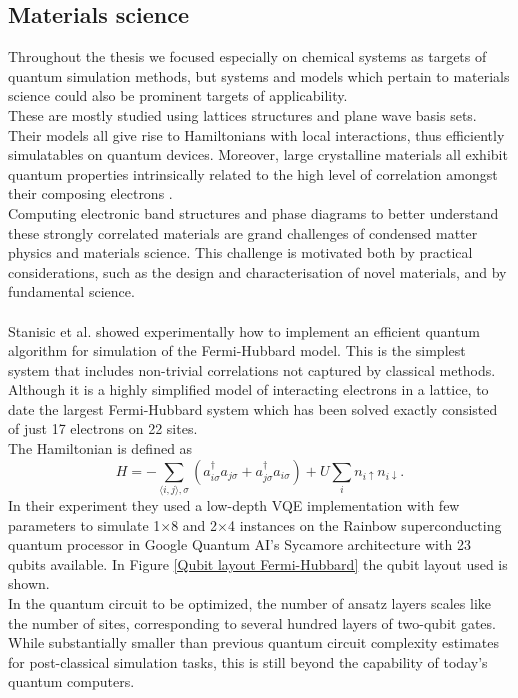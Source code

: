 \subsection{Materials science}
Throughout the thesis we focused especially on chemical systems as targets of quantum simulation methods, but systems and models which pertain to materials science could also be prominent targets of applicability. \\
These are mostly studied using lattices structures and plane wave basis sets. Their models all give rise to Hamiltonians with local interactions, thus efficiently simulatables on quantum devices. Moreover, large crystalline materials all exhibit quantum properties intrinsically related to the high level of correlation amongst their composing electrons \cite{Bassman2021Sep}. \\
Computing electronic band structures and phase diagrams to better understand these strongly correlated materials are grand challenges of condensed matter physics and materials science. This challenge is motivated both by practical considerations, such as the design and characterisation of novel materials, and by fundamental science. \\
\\
Stanisic et al. \cite{Stanisic2021Dec} showed experimentally how to implement an efficient quantum algorithm for simulation of the Fermi-Hubbard model. This is the simplest system that includes non-trivial correlations not captured by classical methods. Although it is a highly simplified model of interacting electrons in a lattice, to date the largest Fermi-Hubbard system which has been solved exactly consisted of just 17 electrons on 22 sites. \\
The Hamiltonian is defined as
\begin{equation}
    H = -\sum_{\langle i,j \rangle, \sigma} (a^{\dagger}_{i\sigma} a_{j\sigma} + a^{\dagger}_{j\sigma} a_{i\sigma}) + U\sum_i n_{i\uparrow} n_{i\downarrow}.
\end{equation}
In their experiment they used a low-depth VQE implementation with few parameters to simulate 1$\times$8 and 2$\times$4 instances on the Rainbow superconducting quantum processor in Google Quantum AI's Sycamore architecture with 23 qubits available. In Figure \ref{Qubit layout Fermi-Hubbard} the qubit layout used is shown. \\
In the quantum circuit to be optimized, the number of ansatz layers scales like the number of sites, corresponding to several hundred layers of two-qubit gates. While substantially smaller than previous quantum circuit complexity estimates for post-classical simulation tasks, this is still beyond the capability of today's quantum computers. \\
